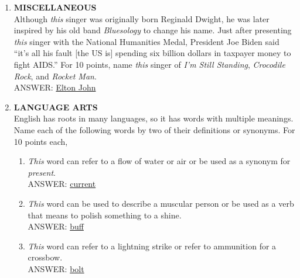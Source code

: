 \documentclass{report}
\newcommand*{\backtrack}{\setcounter{enumi}{\numexpr\theenumi-1\relax}}
\begin{document}
\begin{enumerate}
    \item \textbf{MISCELLANEOUS} \\ Although \textit{this} singer was originally born Reginald Dwight, he was later inspired by his old band \textit{Bluesology} to change his name. Just after presenting \textit{this} singer with the National Humanities Medal, President Joe Biden said ``it's all his fault [the US is] spending six billion dollars in taxpayer money to fight AIDS.'' For 10 points, name \textit{this} singer of \textit{I'm Still Standing}, \textit{Crocodile Rock}, and \textit{Rocket Man}. \\ ANSWER: \underline{Elton John} \backtrack
    \item \textbf{LANGUAGE ARTS} \\ English has roots in many languages, so it has words with multiple meanings. Name each of the following words by two of their definitions or synonyms. For 10 points each,
    \begin{enumerate}[label=\Alph*]
        \item \textit{This} word can refer to a flow of water or air or be used as a synonym for \textit{present}. \\ ANSWER: \underline{current}
        \item \textit{This} word can be used to describe a muscular person or be used as a verb that means to polish something to a shine. \\ ANSWER: \underline{buff}
        \item \textit{This} word can refer to a lightning strike or refer to ammunition for a crossbow. \\ ANSWER: \underline{bolt}
    \end{enumerate}
    

\end{enumerate}
\end{document}
